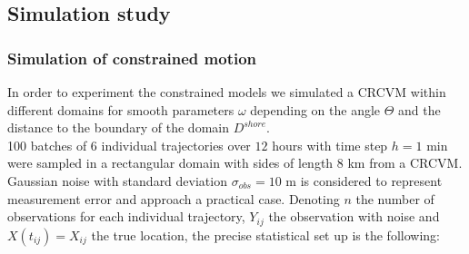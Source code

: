 \documentclass[11pt]{article}
\newcommand {\1}{\mathbb{1}}
\begin{document}
\subsection{Simulation study}

\label{section: simulation study}




\subsubsection{Simulation of constrained motion}
\label{section: simulation constrained motion}
In order to experiment the constrained models we simulated a CRCVM within different domains for smooth parameters $\omega$ depending on the angle $\Theta$ and the distance to the boundary of the domain $D^{shore}$.\\


100 batches of 6 individual trajectories over $12$ hours with time step $h=1$ min were sampled in a rectangular domain with sides of length $8$ km from a CRCVM. Gaussian noise with standard deviation $\sigma_{obs}=10$ m is considered to represent measurement error and approach a practical case. Denoting $n$ the number of observations for each individual trajectory, $Y_{ij}$ the observation with noise and $X(t_{ij})=X_{ij}$ the true location, the precise statistical set up is the following:
\end{document}
